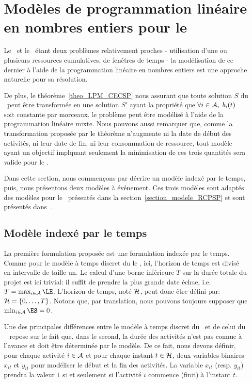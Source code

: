 \section{Modèles de programmation linéaire en nombres entiers pour le
\CECSP}

Le \CECSP ~et le \RCPSP~étant deux problèmes relativement proches -
utilisation d'une ou plusieurs ressources cumulatives, de fenêtres de
temps - la modélisation de ce dernier à l'aide de la programmation
linéaire en nombres entiers est une approche naturelle pour
sa résolution. 

De plus, le théorème~\ref{theo_LPM_CECSP} nous assurant que toute solution
$S$ du \CECSP~peut être transformée en une solution $S'$ ayant la
propriété que $\forall i \in \A,\ b_i(t)$ soit constante par morceaux,
le problème peut être modélisé à l'aide de la programmation linéaire
mixte. Nous pouvons aussi remarquer que, comme la transformation
proposée par le théorème n'augmente ni la date de début des activités,
ni leur date de fin, ni leur consommation de ressource, tout modèle
ayant un objectif implquant seulement la minimisation de ces trois
quantités sera valide pour le \CECSP.

Dans cette section, nous commençons par décrire un modèle indexé par
le temps, puis, nous présentons deux modèles à événement. Ces trois
modèles sont adaptés des modèles pour le \RCPSP~présentés dans la
section~\ref{section_modele_RCPSP} et sont présentés
dans~\cite{Nattaf_ORSpectrum}.  


\subsection{Modèle indexé par le temps}

La première formulation proposée est une formulation indexée par
le temps. Comme pour le modèle à temps discret du le \RCPSP,
ici, l'horizon de temps est divisé en intervalle de taille un. Le
calcul d'une borne inférieure $T$ sur la durée totale du projet
est ici trivial: il suffit de prendre la plus grande date échue,
i.e. $T=\max_{i \in \A} \LE$. L'horizon de temps, noté
${\cal H}$, peut donc être défini par: ${\cal H}=\{0,\dots,T\}$.
Notons que, par translation, nous pouvons toujours supposer que
$\min_{i\in \A} \ES=0$.

Une des principales différences entre le modèle à temps discret du
\RCPSP~et de celui du \CECSP~ repose sur le fait que, dans le
second, la durée des activités n'est pas connue à l'avance et doit
être déterminée par le modèle. De ce fait, nous devons définir,
pour chaque activité $i \in {\cal A}$ et pour chaque instant $t
\in {\cal H}$, deux variables binaires $x_{it}$ et $y_{it}$ pour
modéliser le début et la fin des activités. La variable $x_{it}$
(resp. $y_{it}$) prendra la valeur $1$ si et seulement si
l'activité $i$ commence (finit) à l'instant $t$.

